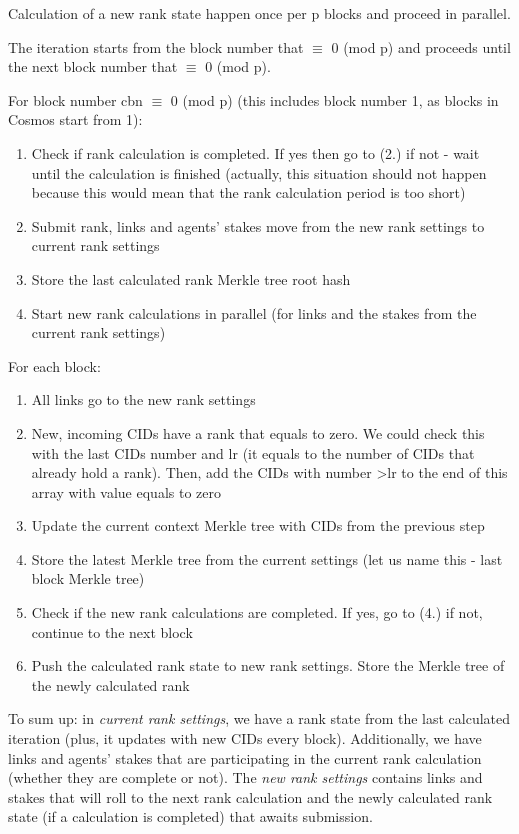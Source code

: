 \documentclass[8pt,oneside]{amsart}
\newcommand{\code}[1]{{\PlayBold #1}}
\begin{document}
\begin{Abstract}
Calculation of a new rank state happen once per \code{p} blocks and proceed in parallel.

The iteration starts from the block number that \code{$\equiv$ 0 (mod p)} and proceeds until the next block number that \code{$\equiv$ 0 (mod p)}.

For block number \code{cbn $\equiv$ 0 (mod p)} (this includes block number 1, as blocks in Cosmos start from 1):

\begin{enumerate}
  \item Check if rank calculation is completed. If yes then go to (2.) if not - wait until the calculation is finished
  (actually, this situation should not happen because this would mean that the rank calculation period is too short)
  \item Submit rank, links and agents' stakes move from the new rank settings to current rank settings
  \item Store the last calculated rank Merkle tree root hash
  \item Start new rank calculations in parallel (for links and the stakes from the current rank settings)
\end{enumerate}

For each block:

\begin{enumerate}
  \item All links go to the new rank settings
  \item New, incoming CIDs have a rank that equals to zero. We could check this with the last CIDs number and \code{lr} (it equals to the number of CIDs that already hold a rank). Then, add the CIDs with number \code{>lr} to the end of this array with value equals to zero
  \item Update the current context Merkle tree with CIDs from the previous step
  \item Store the latest Merkle tree from the current settings (let us name this - last block Merkle tree)
  \item Check if the new rank calculations are completed. If yes, go to (4.) if not, continue to the next block
  \item Push the calculated rank state to new rank settings. Store the Merkle tree of the newly calculated rank
\end{enumerate}
To sum up: in \textit{current rank settings}, we have a rank state from the last calculated iteration (plus, it updates with new CIDs every block). Additionally, we have links and agents' stakes that are participating in the current rank calculation (whether they are complete or not). The \textit{new rank settings} contains links and stakes that will roll to the next rank calculation and the newly calculated rank state (if a calculation is completed) that awaits submission.


\end{Abstract}
\end{document}
